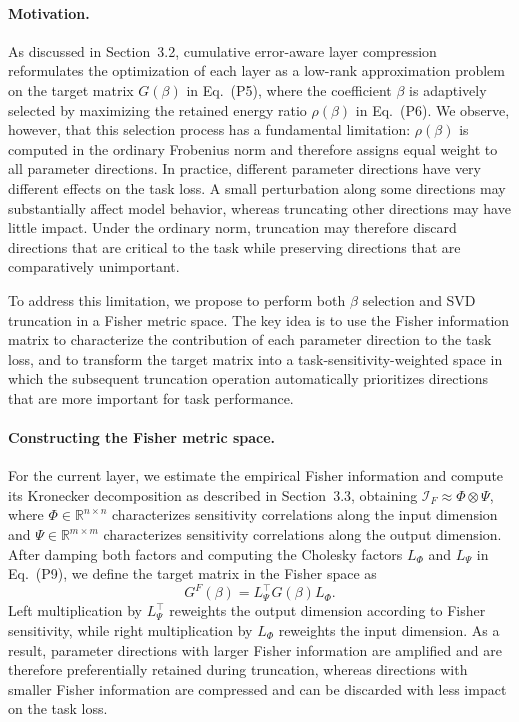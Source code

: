 \documentclass[a4paper,fleqn]{cas-dc}
\begin{document}
\paragraph{Motivation.}
As discussed in Section~3.2, cumulative error-aware layer compression reformulates the optimization of each layer as a low-rank approximation problem on the target matrix $G(\beta)$ in Eq.~(P5), where the coefficient $\beta$ is adaptively selected by maximizing the retained energy ratio $\rho(\beta)$ in Eq.~(P6). We observe, however, that this selection process has a fundamental limitation: $\rho(\beta)$ is computed in the ordinary Frobenius norm and therefore assigns equal weight to all parameter directions. In practice, different parameter directions have very different effects on the task loss. A small perturbation along some directions may substantially affect model behavior, whereas truncating other directions may have little impact. Under the ordinary norm, truncation may therefore discard directions that are critical to the task while preserving directions that are comparatively unimportant.

To address this limitation, we propose to perform both $\beta$ selection and SVD truncation in a Fisher metric space. The key idea is to use the Fisher information matrix to characterize the contribution of each parameter direction to the task loss, and to transform the target matrix into a task-sensitivity-weighted space in which the subsequent truncation operation automatically prioritizes directions that are more important for task performance.

\paragraph{Constructing the Fisher metric space.}
For the current layer, we estimate the empirical Fisher information and compute its Kronecker decomposition as described in Section~3.3, obtaining $\mathcal{I}_F \approx \Phi \otimes \Psi$, where $\Phi \in \mathbb{R}^{n \times n}$ characterizes sensitivity correlations along the input dimension and $\Psi \in \mathbb{R}^{m \times m}$ characterizes sensitivity correlations along the output dimension. After damping both factors and computing the Cholesky factors $L_\Phi$ and $L_\Psi$ in Eq.~(P9), we define the target matrix in the Fisher space as
\begin{equation}
G^F(\beta) = L_\Psi^\top G(\beta) L_\Phi.
\tag{1}
\end{equation}
Left multiplication by $L_\Psi^\top$ reweights the output dimension according to Fisher sensitivity, while right multiplication by $L_\Phi$ reweights the input dimension. As a result, parameter directions with larger Fisher information are amplified and are therefore preferentially retained during truncation, whereas directions with smaller Fisher information are compressed and can be discarded with less impact on the task loss.
\end{document}
